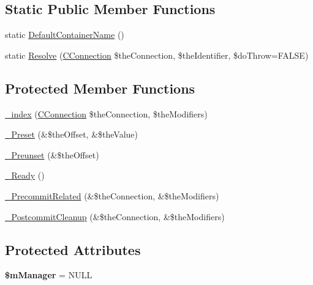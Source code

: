 \subsection*{Static Public Member Functions}
\begin{DoxyCompactItemize}
\item 
static \hyperlink{class_c_user_a9371705ee2fe545cf966b1bf3bd8c574}{Default\-Container\-Name} ()
\item 
static \hyperlink{class_c_user_a41767eb89356bfc787eabbe5596df36d}{Resolve} (\hyperlink{class_c_connection}{C\-Connection} \$the\-Connection, \$the\-Identifier, \$do\-Throw=F\-A\-L\-S\-E)
\end{DoxyCompactItemize}
\subsection*{Protected Member Functions}
\begin{DoxyCompactItemize}
\item 
\hyperlink{class_c_user_afe88b46176ec8227c8ee5d6b1e6e758f}{\-\_\-index} (\hyperlink{class_c_connection}{C\-Connection} \$the\-Connection, \$the\-Modifiers)
\item 
\hyperlink{class_c_user_ac4d911d88bee7897d0fc257f126eb66a}{\-\_\-\-Preset} (\&\$the\-Offset, \&\$the\-Value)
\item 
\hyperlink{class_c_user_a44a9117071cea9d4933c08ef347006d6}{\-\_\-\-Preunset} (\&\$the\-Offset)
\item 
\hyperlink{class_c_user_a9f55517030b5670e0ddadca1004b0b08}{\-\_\-\-Ready} ()
\item 
\hyperlink{class_c_user_af6fe894a0a45226f314057a5c40f3bd1}{\-\_\-\-Precommit\-Related} (\&\$the\-Connection, \&\$the\-Modifiers)
\item 
\hyperlink{class_c_user_aa05407c9768b02801a2a8f47414de1fd}{\-\_\-\-Postcommit\-Cleanup} (\&\$the\-Connection, \&\$the\-Modifiers)
\end{DoxyCompactItemize}
\subsection*{Protected Attributes}
\begin{DoxyCompactItemize}
\item 
\hypertarget{class_c_user_a17d9745db7fcc2f05478bc17c734666f}{{\bfseries \$m\-Manager} = N\-U\-L\-L}\label{class_c_user_a17d9745db7fcc2f05478bc17c734666f}

\end{DoxyCompactItemize}


